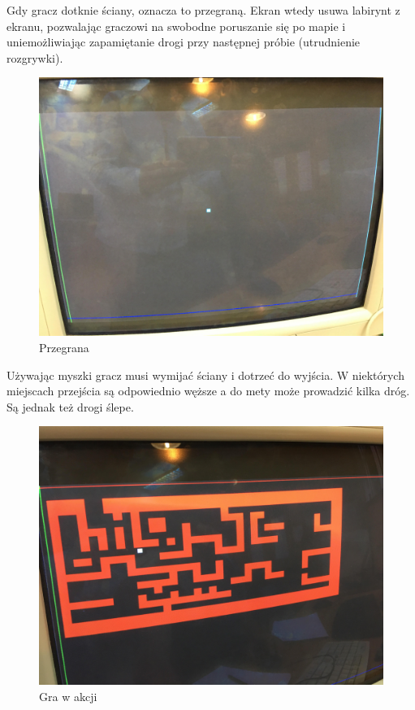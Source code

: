\documentclass[a4paper]{article}
\begin{document}
Gdy gracz dotknie ściany, oznacza to przegraną. Ekran wtedy usuwa labirynt z ekranu, pozwalając graczowi na swobodne poruszanie się po mapie i uniemożliwiając zapamiętanie drogi przy następnej próbie (utrudnienie rozgrywki).

\begin{figure}[H]
  \caption{Przegrana}
  \includegraphics[scale=0.05]{przegrana}
  \centering
\end{figure}

Używając myszki gracz musi wymijać ściany i dotrzeć do wyjścia. W niektórych miejscach przejścia są odpowiednio węższe a do mety może prowadzić kilka dróg. Są jednak też drogi ślepe.

\begin{figure}[H]
  \caption{Gra w akcji}
  \includegraphics[scale=0.05]{gra2}
  \centering
\end{figure}
\end{document}

